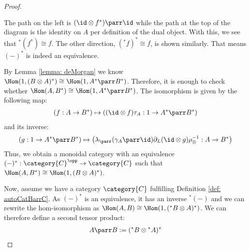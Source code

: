 \documentclass[DIN, pagenumber=false, fontsize=11pt, parskip=half, colorinlistoftodos, svgnames]{scrartcl}
\begin{document}
\begin{proof}
\begin{center}
\begin{sideways}
			\end{sideways}
		\end{center}
		
		The path on the left is $(\id \otimes f^*) \parr \id $ while the path at the top of the diagram is the identity on $A$ per definition of the dual object. With this, we see that ${^*}(f^*) \cong f$. The other direction, $({^*f})^*\cong f$, is shown similarly. That means $(-)^*$ is indeed an equivalence.  
		
		By Lemma \ref{lemma: deMorgan} we know 
		$\Hom(1, (B \otimes A)^* ) \cong \Hom(1, A^* \parr B^*) $. 
		Therefore, it is enough to check whether 
		$\Hom(A, B^*) \cong \Hom(1, A^* \parr B^*) $.
		The isomorphism is given by the following map:
		\begin{align*}
			(f: A\rightarrow B^*) 
			\mapsto 
			\left((\id \otimes f)\tau_A : 1 \rightarrow A^* \parr B^* \right)
		\end{align*} 
		and its inverse:
		\begin{align*}
			(g: 1\rightarrow A^* \parr B^*) 
			\mapsto 
			\left(\lambda_\parr(\gamma_A  \parr \id) \partial_L (\id \otimes g) \rho_\otimes^{-1} : A \rightarrow B^* \right)
		\end{align*}
		Thus, we obtain a monoidal category with an equivalence 
		$(-)^*:\category{C}^\opp \rightarrow \category{C} $ 
		such that 
		$\Hom(A, B^*) \cong \Hom(1, (B \otimes A)^* )$.
		
		Now, assume we have a category $\category{C}$ fulfilling Definition \ref{def: autoCatBarrC}. As $(-)^*$ is an equivalence, it has an inverse ${^*(-)}$ and we can rewrite the hom-isomorphism as $\Hom(A, B) \cong \Hom( 1, ( {^*B} \otimes A )^* )$.
		We can therefore define a second tensor product: 
		\begin{align*}
			A \parr B := ({^*B} \otimes {^*A})^*
		\end{align*} 
		

\end{proof}
\end{document}

